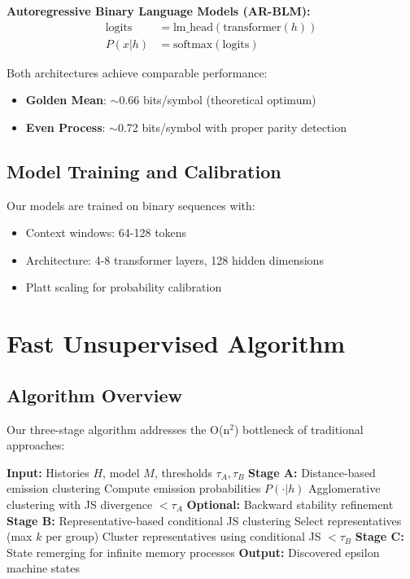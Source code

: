 \documentclass[12pt]{article}
\begin{document}
\textbf{Autoregressive Binary Language Models (AR-BLM):}
\begin{align}
\text{logits} &= \text{lm\_head}(\text{transformer}(h)) \\
P(x|h) &= \text{softmax}(\text{logits})
\end{align}

Both architectures achieve comparable performance:
\begin{itemize}
    \item \textbf{Golden Mean}: $\sim$0.66 bits/symbol (theoretical optimum)
    \item \textbf{Even Process}: $\sim$0.72 bits/symbol with proper parity detection
\end{itemize}

\subsection{Model Training and Calibration}

Our models are trained on binary sequences with:
\begin{itemize}
    \item Context windows: 64-128 tokens
    \item Architecture: 4-8 transformer layers, 128 hidden dimensions
    \item Platt scaling for probability calibration
\end{itemize}

\section{Fast Unsupervised Algorithm}

\subsection{Algorithm Overview}

Our three-stage algorithm addresses the O(n$^2$) bottleneck of traditional approaches:

\begin{algorithm}
\caption{Fast Unsupervised Epsilon Machine Discovery}
\begin{algorithmic}[1]
\STATE \textbf{Input:} Histories $H$, model $M$, thresholds $\tau_A, \tau_B$
\STATE \textbf{Stage A:} Distance-based emission clustering
    \STATE Compute emission probabilities $P(\cdot|h)$
\ENDFOR
\STATE Agglomerative clustering with JS divergence $< \tau_A$
\STATE \textbf{Optional:} Backward stability refinement
\STATE \textbf{Stage B:} Representative-based conditional JS clustering
    \STATE Select representatives (max $k$ per group)
    \STATE Cluster representatives using conditional JS $< \tau_B$
\ENDFOR
\STATE \textbf{Stage C:} State remerging for infinite memory processes
\STATE \textbf{Output:} Discovered epsilon machine states
\end{algorithmic}
\end{algorithm}
\end{document}
